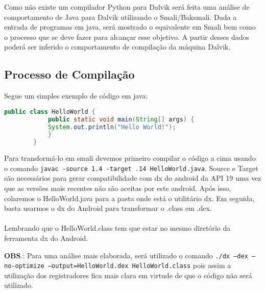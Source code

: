 \documentclass[hidelinks,12pt]{article}
\begin{document}
	Como não existe um compilador Python para Dalvik será feita uma análise de comportamento de Java para Dalvik utilizando o Smali/Baksmali. Dada a entrada de programas em java, será mostrado o equivalente em Smali bem como o processo que se deve fazer para alcançar esse objetivo. A partir desses dados poderá ser inferido o comportamento de compilação da máquina Dalvik.
	
	\subsection{Processo de Compilação}
	
	Segue um simples exemplo de código em java:
	
	\begin{lstlisting}[caption=Hello World em Java,language=java]
		public class HelloWorld {
			public static void main(String[] args) {
			System.out.println("Hello World!");
			}
		}
	\end{lstlisting}
	
	Para transformá-lo em smali devemos primeiro compilar o código a cima usando o comando \texttt{javac -source 1.4 -target .14 HelloWorld.java}. Source e Target são necessários para gerar compatibilidade com dx do android da API 19 uma vez que as versões mais recentes não são aceitas por este android. Após isso, colaremos o HelloWorld.java para a pasta onde está o utilitário dx.
	Em seguida, basta usarmos o dx do Android para transformar o .class em .dex.\\
	

	\noindent{}\\	
	
	Lembrando que o HelloWorld.class tem que estar no mesmo diretório da ferramenta dx do Android.
	
	\textbf{OBS}.: Para uma análise mais elaborada, será utilizado o comando \texttt{./dx --dex --no-optimize --output=HelloWorld.dex HelloWorld.class} pois assim a utilização dos registradores fica mais clara em virtude de que o código não será utilizado.
	
\end{document}
